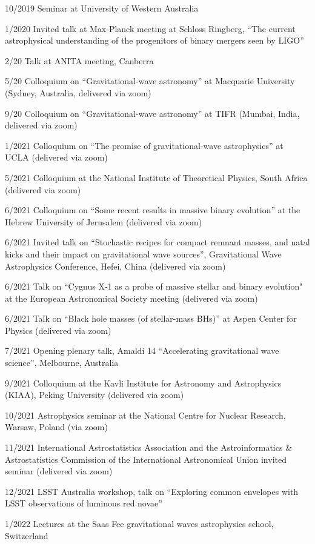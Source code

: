 \documentclass[margin,line]{res}
\begin{document}
\begin{resume}
10/2019 Seminar at University of Western Australia

1/2020 Invited talk at Max-Planck meeting at Schloss Ringberg, ``The current astrophysical understanding of the progenitors of binary mergers seen by LIGO''

2/20 Talk at ANITA meeting, Canberra

5/20 Colloquium on ``Gravitational-wave astronomy'' at Macquarie University (Sydney, Australia, delivered via zoom)

9/20 Colloquium on  ``Gravitational-wave astronomy'' at TIFR (Mumbai, India, delivered via zoom)

1/2021 Colloquium on ``The promise of gravitational-wave astrophysics'' at UCLA (delivered via zoom)

5/2021 Colloquium at the National Institute of Theoretical Physics, South Africa (delivered via zoom)

6/2021 Colloquium on ``Some recent results in massive binary evolution''  at the Hebrew University of Jerusalem (delivered via zoom)

6/2021 Invited talk on ``Stochastic recipes for compact remnant masses, and natal kicks and their impact on gravitational wave sources'', Gravitational Wave Astrophysics Conference, Hefei, China  (delivered via zoom)

6/2021 Talk on ``Cygnus X-1 as a probe of massive stellar and binary evolution" at the European Astronomical Society meeting (delivered via zoom)

6/2021 Talk on ``Black hole masses (of stellar-mass BHs)'' at Aspen Center for Physics (delivered via zoom)

7/2021 Opening plenary talk, Amaldi 14 ``Accelerating gravitational wave science'', Melbourne, Australia

9/2021 Colloquium at the Kavli Institute for Astronomy and Astrophysics (KIAA), Peking University (delivered via zoom)

10/2021 Astrophysics seminar at the National Centre for Nuclear Research, Warsaw, Poland (via zoom)

11/2021 International Astrostatistics Association and the Astroinformatics \& Astrostatistics Commission of the International Astronomical Union invited seminar (delivered via zoom)

12/2021 LSST Australia workshop, talk on ``Exploring common envelopes with LSST observations of luminous red novae''

1/2022 Lectures at the Saas Fee gravitational waves astrophysics school, Switzerland


\end{resume}
\end{document}
